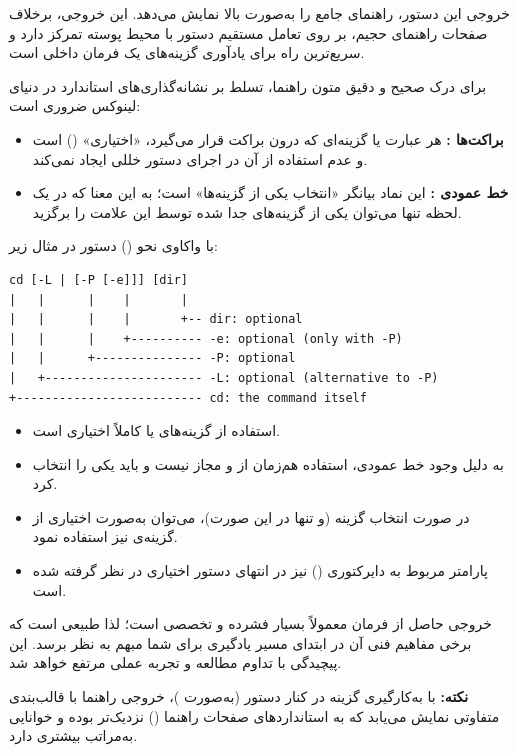 خروجی این دستور، راهنمای جامع  را به‌صورت بالا نمایش می‌دهد. این خروجی، برخلاف صفحات راهنمای حجیم، بر روی تعامل مستقیم دستور با محیط پوسته تمرکز دارد و سریع‌ترین راه برای یادآوری گزینه‌های یک فرمان داخلی است.

برای درک صحیح و دقیق متون راهنما، تسلط بر نشانه‌گذاری‌های استاندارد در دنیای لینوکس ضروری است:

\begin{itemize}
  \item \textbf{براکت‌ها \cmd{[]}:} هر عبارت یا گزینه‌ای که درون براکت قرار می‌گیرد، «اختیاری» () است و عدم استفاده از آن در اجرای دستور خللی ایجاد نمی‌کند.
  \item \textbf{خط عمودی \cmd{|}:} این نماد بیانگر «انتخاب یکی از گزینه‌ها» است؛ به این معنا که در یک لحظه تنها می‌توان یکی از گزینه‌های جدا شده توسط این علامت را برگزید.
\end{itemize}

با واکاوی نحو () دستور  در مثال زیر:

\begin{latin}
\begin{lstlisting}
cd [-L | [-P [-e]]] [dir]
|   |      |    |       |
|   |      |    |       +-- dir: optional
|   |      |    +---------- -e: optional (only with -P)
|   |      +--------------- -P: optional
|   +---------------------- -L: optional (alternative to -P)
+-------------------------- cd: the command itself
\end{lstlisting}
\end{latin}

\begin{itemize}
  \item استفاده از گزینه‌های  یا  کاملاً اختیاری است.
  \item به دلیل وجود خط عمودی، استفاده هم‌زمان از  و  مجاز نیست و باید یکی را انتخاب کرد.
  \item در صورت انتخاب گزینه  (و تنها در این صورت)، می‌توان به‌صورت اختیاری از گزینه‌ی  نیز استفاده نمود.
  \item پارامتر مربوط به دایرکتوری () نیز در انتهای دستور اختیاری در نظر گرفته شده است.
\end{itemize}

خروجی حاصل از فرمان  معمولاً بسیار فشرده و تخصصی است؛ لذا طبیعی است که برخی مفاهیم فنی آن در ابتدای مسیر یادگیری برای شما مبهم به نظر برسد. این پیچیدگی با تداوم مطالعه و تجربه عملی مرتفع خواهد شد.

\begin{note}
\textbf{نکته:} با به‌کارگیری گزینه  در کنار دستور  (به‌صورت )، خروجی راهنما با قالب‌بندی متفاوتی نمایش می‌یابد که به استانداردهای صفحات راهنما () نزدیک‌تر بوده و خوانایی به‌مراتب بیشتری دارد.
\end{note}

